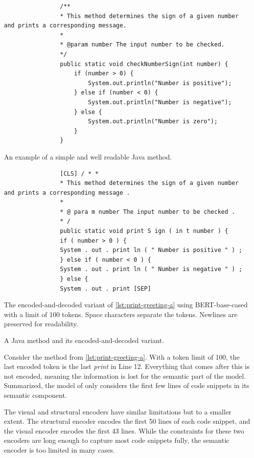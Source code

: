 \documentclass[%
class=scrreprt,
chapterprefix=false,%
open=right,%
twoside=true,%
paper=a4,%
logofile={Logo\_zentral\_farbig\_EN.png},%
thesistype=master,%
UKenglish,%
]{se2thesis}
\theoremstyle{definition}
\begin{document}
	\begin{listing}[p]
		\begin{sublisting}{\linewidth}
			\begin{verbatim}
				/**
				* This method determines the sign of a given number and prints a corresponding message.
				*
				* @param number The input number to be checked.
				*/
				public static void checkNumberSign(int number) {
					if (number > 0) {
						System.out.println("Number is positive");
					} else if (number < 0) {
						System.out.println("Number is negative");
					} else {
						System.out.println("Number is zero");
					}
				}
			\end{verbatim}
			\caption{An example of a simple and well readable Java method.}
			\label{lst:print-greeting-a}
		\end{sublisting}
		
		\begin{sublisting}{\linewidth}
			\begin{verbatim}
				[CLS] / * *
				* This method determines the sign of a given number and prints a corresponding message .
				*
				* @ para m number The input number to be checked .
				* /
				public static void print S ign ( in t number ) {
				if ( number > 0 ) {
				System . out . print ln ( " Number is positive " ) ;
				} else if ( number < 0 ) {
				System . out . print ln ( " Number is negative " ) ;
				} else {
				System . out . print [SEP]
			\end{verbatim}
			\caption{The encoded-and-decoded variant of \autoref{lst:print-greeting-a} using BERT-base-cased with a limit of 100 tokens. Space characters separate the tokens. Newlines are preserved for readability.}
			\label{lst:print-greeting-b}
		\end{sublisting}
		\caption{A Java method and its encoded-and-decoded variant.}
		\label{lst:print-greeting}
	\end{listing}
	
	Consider the method from \autoref{lst:print-greeting-a}. With a token limit of 100, the last encoded token is the last \textit{print} in Line 12. Everything that comes after this is not encoded, meaning the information is lost for the semantic part of the model. Summarized, the model of \citeauthor{mi2022towards} only considers the first few lines of code snippets in its semantic component.
	
	The visual and structural encoders have similar limitations but to a smaller extent. The structural encoder encodes the first 50 lines of each code snippet, and the visual encoder encodes the first 43 lines. While the constraints for these two encoders are long enough to capture most code snippets fully, the semantic encoder is too limited in many cases.
\end{document}
